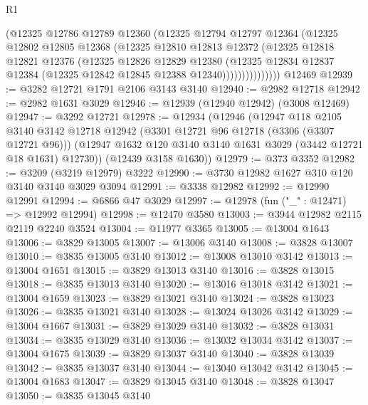 \begin{lexlean}{R1}
\begin{coremodule}
                  (@12325
                    @12786
                    @12789
                    @12360
                    (@12325
                      @12794
                      @12797
                      @12364
                      (@12325
                        @12802
                        @12805
                        @12368
                        (@12325
                          @12810
                          @12813
                          @12372
                          (@12325
                            @12818
                            @12821
                            @12376
                            (@12325
                              @12826
                              @12829
                              @12380
                              (@12325
                                @12834
                                @12837
                                @12384
                                (@12325 @12842 @12845 @12388 @12340)))))))))))))))
    @12469
@12939 := @3282 @12721 @1791 @2106 @3143 @3140
@12940 := @2982 @12718
@12942 := @2982 @1631 @3029
@12946 := @12939 (@12940 @12942) (@3008 @12469)
@12947 := @3292 @12721
@12978 := @12934
    (@12946
      (@12947
        @118
        @2105
        @3140
        @3142
        @12718
        @12942
        (@3301 @12721 @96 @12718 (@3306 (@3307 @12721 @96)))
        (@12947 @1632 @120 @3140 @3140 @1631 @3029 (@3442 @12721 @18 @1631) @12730))
      (@12439 @3158 @1630))
@12979 := @373 @3352
@12982 := @3209 (@3219 @12979) @3222
@12990 := @3730 @12982 @1627 @310 @120 @3140 @3140 @3029 @3094
@12991 := @3338 @12982
@12992 := @12990 @12991
@12994 := @6866 @47 @3029
@12997 := @12978 (fun ("_" : @12471) => @12992 @12994)
@12998 := @12470 @3580
@13003 := @3944 @12982 @2115 @2119 @2240 @3524
@13004 := @11977 @3365
@13005 := @13004 @1643
@13006 := @3829 @13005
@13007 := @13006 @3140
@13008 := @3828 @13007
@13010 := @3835 @13005 @3140
@13012 := @13008 @13010 @3142
@13013 := @13004 @1651
@13015 := @3829 @13013 @3140
@13016 := @3828 @13015
@13018 := @3835 @13013 @3140
@13020 := @13016 @13018 @3142
@13021 := @13004 @1659
@13023 := @3829 @13021 @3140
@13024 := @3828 @13023
@13026 := @3835 @13021 @3140
@13028 := @13024 @13026 @3142
@13029 := @13004 @1667
@13031 := @3829 @13029 @3140
@13032 := @3828 @13031
@13034 := @3835 @13029 @3140
@13036 := @13032 @13034 @3142
@13037 := @13004 @1675
@13039 := @3829 @13037 @3140
@13040 := @3828 @13039
@13042 := @3835 @13037 @3140
@13044 := @13040 @13042 @3142
@13045 := @13004 @1683
@13047 := @3829 @13045 @3140
@13048 := @3828 @13047
@13050 := @3835 @13045 @3140

\end{coremodule}
\end{lexlean}
